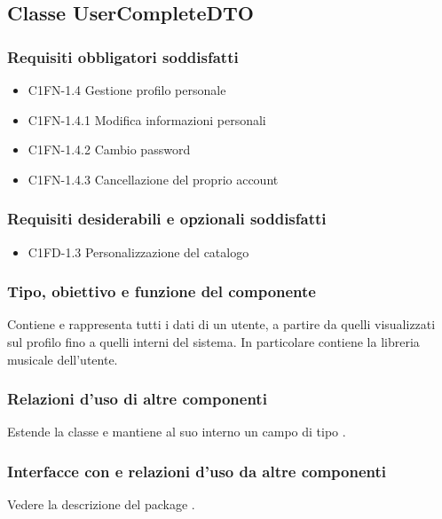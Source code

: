 \subsection{Classe UserCompleteDTO}
\subsubsection*{Requisiti obbligatori soddisfatti}
\begin{itemize}
    \item C1FN-1.4 Gestione profilo personale
    \item C1FN-1.4.1 Modifica informazioni personali
    \item C1FN-1.4.2 Cambio password
    \item C1FN-1.4.3 Cancellazione del proprio account
\end{itemize}
\subsubsection*{Requisiti desiderabili e opzionali soddisfatti}
\begin{itemize}
    \item C1FD-1.3 Personalizzazione del catalogo
\end{itemize}
\subsubsection*{Tipo, obiettivo e funzione del componente}
Contiene e rappresenta tutti i dati di un utente, a partire da quelli
visualizzati sul profilo fino a quelli interni del sistema. In particolare
contiene la libreria musicale dell'utente. 
\subsubsection*{Relazioni d'uso di
altre componenti} Estende la classe  e mantiene al suo interno un campo di tipo
. 
\subsubsection*{Interfacce con e relazioni d'uso da altre
componenti} Vedere la descrizione del package .
